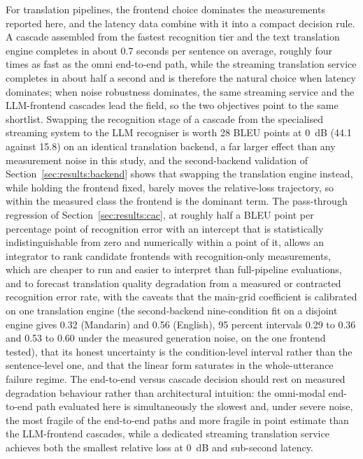 For translation pipelines, the frontend choice dominates the measurements
reported here, and the latency data combine with it into a compact decision
rule. A cascade assembled from the fastest recognition tier and the text
translation engine completes in about 0.7 seconds per sentence on average,
roughly four times as fast as the omni end-to-end path, while the streaming
translation service completes in about half a second and is therefore the
natural choice when latency dominates; when noise robustness dominates, the
same streaming service and the LLM-frontend cascades lead the field, so the
two objectives point to the same shortlist. Swapping the recognition stage
of a cascade from the specialised streaming system to the LLM recogniser is
worth 28 BLEU points at 0~dB (44.1 against 15.8) on an identical translation backend, a far
larger effect than any measurement noise in this study, and the
second-backend validation of Section~\ref{sec:results:backend} shows that
swapping the translation engine instead, while holding the frontend fixed,
barely moves the relative-loss trajectory, so within the measured class the
frontend is the dominant term. The pass-through regression of
Section~\ref{sec:results:cac}, at roughly half a BLEU point per percentage
point of recognition error with an intercept that is statistically
indistinguishable from zero and numerically within a point of it, allows an
integrator to rank candidate frontends with recognition-only measurements,
which are cheaper to run and easier to interpret than full-pipeline
evaluations, and to forecast translation quality degradation from a
measured or contracted recognition error rate, with the caveats that the
main-grid coefficient is calibrated on one translation engine (the
second-backend nine-condition fit on a disjoint engine gives 0.32
(Mandarin) and 0.56 (English), 95 percent intervals 0.29 to 0.36 and 0.53
to 0.60 under the measured generation noise, on the one frontend tested),
that its honest
uncertainty is the condition-level interval rather than the sentence-level
one, and that the linear form saturates in the whole-utterance failure
regime. The end-to-end versus
cascade decision should rest on measured degradation behaviour rather than
architectural intuition: the omni-modal end-to-end path evaluated here is
simultaneously the slowest and, under severe noise, the most fragile of the
end-to-end paths and more fragile in point estimate than the LLM-frontend
cascades, while a dedicated streaming translation service
achieves both the smallest relative loss at 0~dB and sub-second latency.

